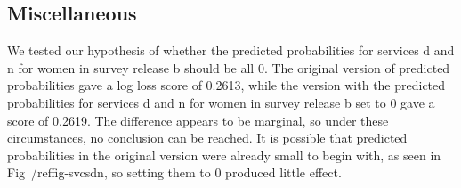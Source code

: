 \documentclass{article}\usepackage[]{graphicx}\usepackage[]{color}
\begin{document}
\subsection{Miscellaneous}                                                                                                                                                                                                                                                                                                                                                                                                                                                                                                                                                                                                We tested our hypothesis of whether the predicted probabilities for services d and n for women in survey release b should be all 0. The original version of predicted probabilities gave a log loss score of 0.2613, while the version with the predicted probabilities for services d and n for women in survey release b set to 0 gave a score of 0.2619. The difference appears to be marginal, so under these circumstances, no conclusion can be reached. It is possible that predicted probabilities in the original version were already small to begin with, as seen in Fig~/ref{fig-svcsdn}, so setting them to 0 produced little effect.
\end{document}
